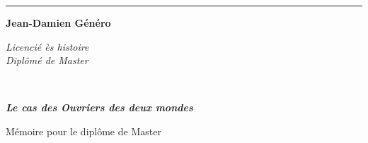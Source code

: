 \begin{titlepage}
\begin{center}

\bigskip

\begin{large}
\end{large}
\begin{center}\rule{2cm}{0.02cm}\end{center}

\bigskip
\bigskip
\bigskip
\begin{Large}
\textbf{Jean-Damien Généro}\\
\end{Large}
\begin{normalsize} \textit{Licencié ès histoire}\\
\textit{Diplômé de Master}\\
\end{normalsize}

\bigskip
\bigskip
\bigskip

\begin{Huge}
\textbf{}\\
\end{Huge}
\bigskip
\bigskip
\begin{LARGE}
\textbf{\emph{Le cas des Ouvriers des deux mondes} }\\
\end{LARGE}

\bigskip
\bigskip
\bigskip
\begin{large}
\end{large}
\vfill

\begin{large}
Mémoire 
pour le diplôme de Master \\
\tnah \\
\end{large}

\end{center}
\end{titlepage}